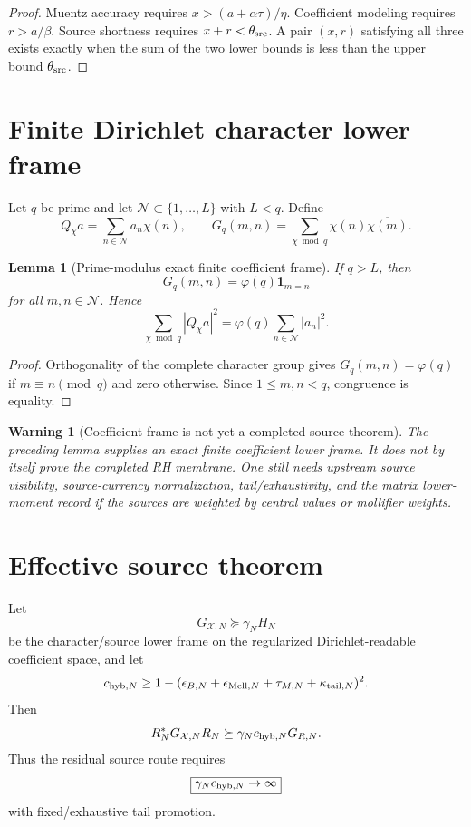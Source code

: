 \documentclass[11pt]{article}
\newtheorem{lemma}{Lemma}
\newtheorem{warning}{Warning}
\begin{document}
\begin{proof}
Muentz accuracy requires $x>(a+\alpha\tau)/\eta$. Coefficient modeling requires $r>a/\beta$. Source shortness requires $x+r<\theta_{\rm src}$. A pair $(x,r)$ satisfying all three exists exactly when the sum of the two lower bounds is less than the upper bound $\theta_{\rm src}$.
\end{proof}

\section{Finite Dirichlet character lower frame}
Let $q$ be prime and let $\mathcal N\subset\{1,\dots,L\}$ with $L<q$. Define
\[
Q_\chi a=\sum_{n\in\mathcal N}a_n\chi(n),
\qquad
G_q(m,n)=\sum_{\chi\bmod q}\chi(n)\overline{\chi(m)}.
\]

\begin{lemma}[Prime-modulus exact finite coefficient frame]
If $q>L$, then
\[
G_q(m,n)=\varphi(q)\mathbf 1_{m=n}
\]
for all $m,n\in\mathcal N$. Hence
\[
\sum_{\chi\bmod q}|Q_\chi a|^2
=\varphi(q)\sum_{n\in\mathcal N}|a_n|^2.
\]
\end{lemma}

\begin{proof}
Orthogonality of the complete character group gives $G_q(m,n)=\varphi(q)$ if $m\equiv n\pmod q$ and zero otherwise. Since $1\le m,n<q$, congruence is equality.
\end{proof}

\begin{warning}[Coefficient frame is not yet a completed source theorem]
The preceding lemma supplies an exact finite coefficient lower frame. It does not by itself prove the completed RH membrane. One still needs upstream source visibility, source-currency normalization, tail/exhaustivity, and the matrix lower-moment record if the sources are weighted by central values or mollifier weights.
\end{warning}

\section{Effective source theorem}
Let
\[
G_{\mathcal X,N}\succeq \gamma_N H_N
\]
be the character/source lower frame on the regularized Dirichlet-readable coefficient space, and let
\[
c_{{\rm hyb},N}\ge 1-(\epsilon_{B,N}+\epsilon_{{\rm Mell},N}+\tau_{M,N}+\kappa_{{\rm tail},N})^2.
\]
Then
\[
R_N^*G_{\mathcal X,N}R_N\succeq \gamma_Nc_{{\rm hyb},N}G_{R,N}.
\]
Thus the residual source route requires
\[
\boxed{\gamma_Nc_{{\rm hyb},N}\to\infty}
\]
with fixed/exhaustive tail promotion.
\end{document}
